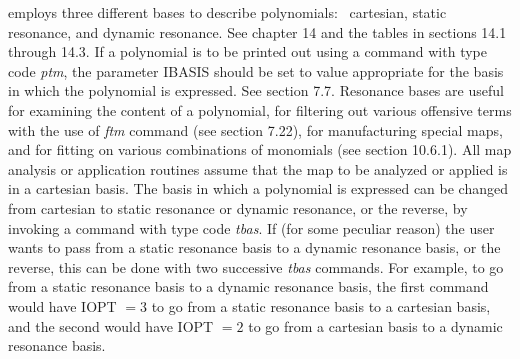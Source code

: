 \Mary employs three different bases to describe polynomials: \ cartesian, static resonance, and dynamic resonance.  See chapter 14 and the tables in sections 14.1 through 14.3.  If a polynomial is to be printed out using a command with type code {\em ptm}, the parameter IBASIS should be set to value appropriate for the basis in which the polynomial is expressed.  See section 7.7.  Resonance bases are useful for examining the content of a polynomial, for filtering out various offensive terms with the use of {\em ftm} command (see section 7.22), for manufacturing special maps, and for fitting on various combinations of monomials (see section 10.6.1).  All map analysis or application routines assume that the map to be analyzed or applied is in a cartesian basis.  The basis in which a polynomial is expressed can be changed from cartesian to static resonance or dynamic resonance, or the reverse, by invoking a command with type code {\em tbas}.  If (for some peculiar reason) the user wants to pass from a static resonance basis to a dynamic resonance basis, or the reverse, this can be done with two successive {\em tbas} commands.  For example, to go from a static resonance basis to a dynamic resonance basis, the first command would have IOPT $= 3$ to go from a static resonance basis to a cartesian basis, and the second would have IOPT $= 2$ to go from a cartesian basis to a dynamic resonance basis.

\newpage

